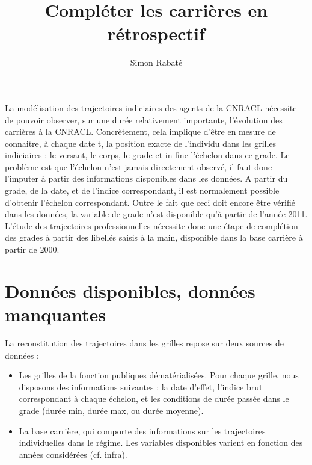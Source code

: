 \documentclass[11pt,a4paper]{article}
\begin{document}
\title{Compléter les carrières en rétrospectif}


\author{Simon Rabat\'e}


\maketitle

La modélisation des trajectoires indiciaires des agents de la CNRACL nécessite de pouvoir
observer, sur une durée relativement importante, l’évolution des carrières à la CNRACL.
Concrètement, cela implique d’être en mesure de connaitre, à chaque date t, la position exacte
de l’individu dans les grilles indiciaires : le versant, le corps, le grade et in fine l’échelon dans
ce grade.
Le problème est que l’échelon n’est jamais directement observé, il faut donc l’imputer à
partir des informations disponibles dans les données. A partir du grade, de la date, et de
l’indice correspondant, il est normalement possible d’obtenir l’échelon correspondant. Outre
le fait que ceci doit encore être vérifié dans les données, la variable de grade n’est disponible
qu’à partir de l’année 2011. L’étude des trajectoires professionnelles nécessite donc une étape
de complétion des grades à partir des libellés saisis à la main, disponible dans la base carrière
à partir de 2000.

\section{Données disponibles, données manquantes}

La reconstitution des trajectoires dans les grilles repose sur deux sources de données :
\begin{itemize}[leftmargin=2cm ,parsep=0cm,itemsep=0cm,topsep=0cm] 
\item Les grilles de la fonction publiques dématérialisées. Pour chaque grille, nous disposons
des informations suivantes : la date d'effet, l'indice brut correspondant à chaque échelon, et les conditions de durée passée dans le grade (durée min, durée max, ou durée moyenne).
\item La base carrière, qui comporte des informations sur les trajectoires individuelles dans le régime. Les variables disponibles varient en fonction des années considérées
(cf. infra).

\end{itemize}
\end{document}
